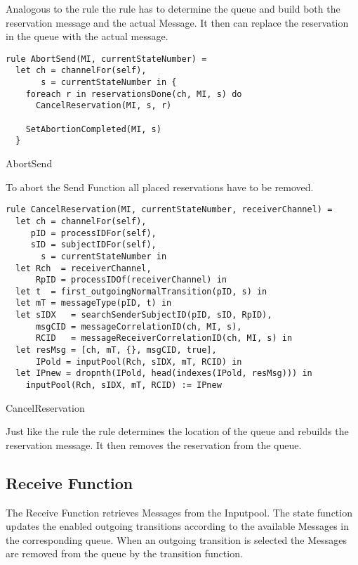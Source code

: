 Analogous to the  rule the
 rule has to determine the queue and build both
the reservation message and the actual Message. It then can replace the reservation
in the queue with the actual message.


\begin{listing}[H]
\begin{verbatim}
rule AbortSend(MI, currentStateNumber) =
  let ch = channelFor(self),
       s = currentStateNumber in {
    foreach r in reservationsDone(ch, MI, s) do
      CancelReservation(MI, s, r)

    SetAbortionCompleted(MI, s)
  }
\end{verbatim}
\caption{AbortSend}
\label{lst:shortasm:AbortSend}
\end{listing}


To abort the Send Function all placed reservations have to be removed.


\begin{listing}[H]
\begin{verbatim}
rule CancelReservation(MI, currentStateNumber, receiverChannel) =
  let ch = channelFor(self),
     pID = processIDFor(self),
     sID = subjectIDFor(self),
       s = currentStateNumber in
  let Rch  = receiverChannel,
      RpID = processIDOf(receiverChannel) in
  let t  = first_outgoingNormalTransition(pID, s) in
  let mT = messageType(pID, t) in
  let sIDX   = searchSenderSubjectID(pID, sID, RpID),
      msgCID = messageCorrelationID(ch, MI, s),
      RCID   = messageReceiverCorrelationID(ch, MI, s) in
  let resMsg = [ch, mT, {}, msgCID, true],
      IPold = inputPool(Rch, sIDX, mT, RCID) in
  let IPnew = dropnth(IPold, head(indexes(IPold, resMsg))) in
    inputPool(Rch, sIDX, mT, RCID) := IPnew
\end{verbatim}
\caption{CancelReservation}
\label{lst:shortasm:CancelReservation}
\end{listing}


Just like the  rule the
 rule determines the location of the queue and
rebuilds the reservation message. It then removes the reservation from the
queue.


\subsection{Receive Function}


The Receive Function retrieves Messages from the Inputpool. The state function
updates the enabled outgoing transitions according to the available Messages in
the corresponding queue. When an outgoing transition is selected the Messages
are removed from the queue by the transition function.


